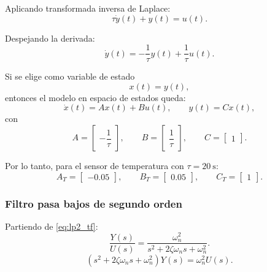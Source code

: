 \documentclass[12pt, a4paper,journal, onecolumn, compsoc]{IEEEtran}
\begin{document}
Aplicando transformada inversa de Laplace:
\begin{equation}
    \tau \dot{y}(t)+y(t)=u(t).
\end{equation}

Despejando la derivada:
\begin{equation}
    \dot{y}(t)=-\frac{1}{\tau}y(t)+\frac{1}{\tau}u(t).
\end{equation}

Si se elige como variable de estado
\begin{equation}
    x(t)=y(t),
\end{equation}
entonces el modelo en espacio de estados queda:
\begin{equation}
    \dot{x}(t)=Ax(t)+Bu(t), \qquad y(t)=Cx(t),
\end{equation}
con
\begin{equation}
    A=\begin{bmatrix}
        -\dfrac{1}{\tau}
    \end{bmatrix},
    \qquad
    B=\begin{bmatrix}
        \dfrac{1}{\tau}
    \end{bmatrix},
    \qquad
    C=\begin{bmatrix}
        1
    \end{bmatrix}.
\end{equation}

Por lo tanto, para el sensor de temperatura con $\tau=20\ \text{s}$:
\begin{equation}
    A_T=\begin{bmatrix}
        -0.05
    \end{bmatrix},
    \qquad
    B_T=\begin{bmatrix}
        0.05
    \end{bmatrix},
    \qquad
    C_T=\begin{bmatrix}
        1
    \end{bmatrix}.
\end{equation}

\subsubsection*{Filtro pasa bajos de segundo orden}

Partiendo de \eqref{eq:lp2_tf}:
\begin{equation}
    \frac{Y(s)}{U(s)}=\frac{\omega_n^2}{s^2+2\zeta\omega_n s+\omega_n^2}.
\end{equation}
\begin{equation}
    (s^2+2\zeta\omega_n s+\omega_n^2)Y(s)=\omega_n^2 U(s).
\end{equation}
\end{document}
